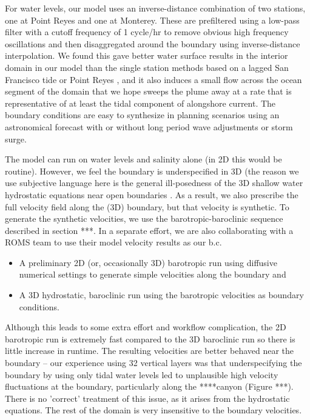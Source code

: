 For water levels, our model uses an inverse-distance combination of two stations, one at Point Reyes and one at Monterey. 
These are prefiltered using a low-pass filter with a cutoff frequency of 1 cycle/hr
 to remove obvious high frequency oscillations and then disaggregated around the boundary using
inverse-distance interpolation. We found this gave better water surface results in the interior domain in our model than the single station methods based on a lagged San Francisco tide \citep{MacWilliams08,MacWilliams09} or Point Reyes \citep{Chua2011}, and it also induces a small flow across the ocean segment of the domain that we hope sweeps the plume away at a rate that is representative of at least the tidal component of alongshore current. The boundary conditions are easy to synthesize in planning scenarios using an astronomical forecast with or without long period wave adjustments or storm surge.

The model can run on water levels and salinity alone (in 2D this would be routine). However, we feel the boundary is underspecified in 3D (the reason we use subjective language here is the general ill-posedness of the 3D shallow water hydrostatic equations near open boundaries \citep{Oliger78}.
As a result, we also prescribe the full velocity field along the (3D) boundary, but that velocity is synthetic. To generate the
synthetic velocities, we use the barotropic-baroclinic sequence described in section ***. In a separate effort, we are also
collaborating with a ROMS team to use their model velocity results as our b.c.

\begin{itemize}
	\item A preliminary 2D (or, occasionally 3D) barotropic run using diffusive numerical settings to generate simple velocities along the boundary and
	\item A 3D hydrostatic, baroclinic run using the barotropic velocities as boundary conditions.
\end{itemize}

Although this leads to some extra effort and workflow complication, the 2D barotropic run is extremely fast compared to the 3D baroclinic run so there is little increase in runtime. The resulting velocities are better behaved near the boundary -- our experience using 32 vertical layers was that underspecifying the boundary by using only tidal water levels led to unplausible high velocity fluctuations at the boundary, particularly along the ****canyon (Figure ***). There is no 'correct' treatment of this issue, as it arises from the hydrostatic equations.  
The rest of the domain is very insensitive to the boundary velocities. 

